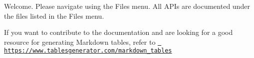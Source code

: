 Welcome. Please navigate using the Files menu. All APIs are documented under the files listed in the Files menu.

If you want to contribute to the documentation and are looking for a good resource for generating Markdown tables, refer to \href{https://www.tablesgenerator.com/markdown_tables}{\texttt{ https\+://www.\+tablesgenerator.\+com/markdown\+\_\+tables}} 